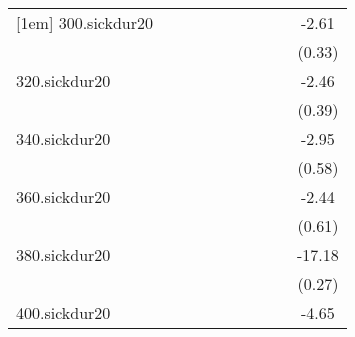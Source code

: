 \documentclass{article}
\begin{document}
{\begin{tabular}{l*{9}{c}}
[1em]
300.sickdur20&                     &                     &                     &                     &                     &                     &                     &                     &       -2.61\sym{***}\\
            &                     &                     &                     &                     &                     &                     &                     &                     &      (0.33)         \\
[1em]
320.sickdur20&                     &                     &                     &                     &                     &                     &                     &                     &       -2.46\sym{***}\\
            &                     &                     &                     &                     &                     &                     &                     &                     &      (0.39)         \\
[1em]
340.sickdur20&                     &                     &                     &                     &                     &                     &                     &                     &       -2.95\sym{***}\\
            &                     &                     &                     &                     &                     &                     &                     &                     &      (0.58)         \\
[1em]
360.sickdur20&                     &                     &                     &                     &                     &                     &                     &                     &       -2.44\sym{***}\\
            &                     &                     &                     &                     &                     &                     &                     &                     &      (0.61)         \\
[1em]
380.sickdur20&                     &                     &                     &                     &                     &                     &                     &                     &      -17.18\sym{***}\\
            &                     &                     &                     &                     &                     &                     &                     &                     &      (0.27)         \\
[1em]
400.sickdur20&                     &                     &                     &                     &                     &                     &                     &                     &       -4.65\sym{***}\\

\end{tabular}}
\end{document}
